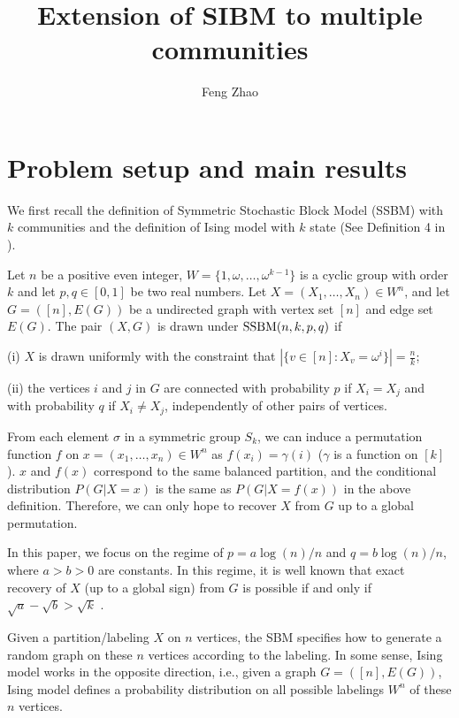 \documentclass{article}
\title{Extension of SIBM to multiple communities}
\author{Feng Zhao}
\begin{document}
\maketitle

\section{Problem setup and main results} \label{s:Preliminaries}
We first recall the definition of Symmetric Stochastic Block Model (SSBM) with $k$ communities and the definition of Ising model with $k$ state (See Definition 4 in \cite{Abbe17}).
\begin{definition} \label{def:SSBM}
Let $n$ be a positive even integer, $W= \{1, \omega, \dots, \omega^{k-1}\}$ is a cyclic group with order $k$ and let $p,q\in[0,1]$ be two real numbers. Let $X=(X_1,\dots,X_n)\in W^n$, and let $G=([n],E(G))$ be a undirected graph with vertex set $[n]$ and edge set $E(G)$. The pair $(X,G)$ is drawn under $\operatorname{SSBM}(n,k,p,q)$ if 

\noindent
(i) $X$ is drawn uniformly with the constraint that $|\{v \in [n] : X_v = \omega^i\}| = \frac{n}{k}$;

\noindent
(ii) the vertices $i$ and $j$ in $G$ are connected with probability $p$ if $X_i=X_j$ and with probability $q$ if $X_i \neq X_j$, independently of other pairs of vertices.
\end{definition}
 
From each element $\sigma$ in a symmetric group $S_k$, we can induce a permutation function $f$ on $x=(x_1,\dots,x_n)\in W^n$ as $f(x_i) = \gamma(i)$ ($\gamma$ is a function on $[k]$).
$x$ and $f(x)$ correspond to the same balanced partition, and the conditional distribution $P(G|X=x)$ is the same as $P(G|X=f(x))$ in the above definition. Therefore, we can only hope to recover $X$ from $G$ up to a global permutation.

In this paper, we focus on the regime of $p=a\log(n)/n$ and $q=b\log(n)/n$, where $a>b> 0$ are constants. In this regime, it is well known that exact recovery of $X$ (up to a global sign) from $G$ is possible if and only if $\sqrt{a}-\sqrt{b} > \sqrt{k}$  \cite{abbe2015exact}.
 
Given a partition/labeling $X$ on $n$ vertices, the SBM specifies how to generate a random graph on these $n$ vertices according to the labeling. In some sense, Ising model works in the opposite direction, i.e., given a graph $G=([n],E(G))$, Ising model defines a probability distribution on all possible labelings $W^n$ of these $n$ vertices. 
\end{document}

